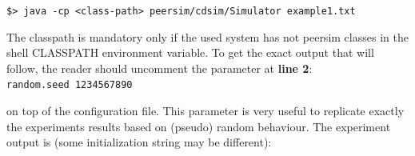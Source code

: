 \documentclass[a4paper,11pt]{article}
\begin{document}
\texttt{\footnotesize \$> java -cp <class-path> peersim/cdsim/Simulator
example1.txt}~\\
{\footnotesize \par}

The classpath is mandatory only if the used system has not peersim
classes in the shell CLASSPATH environment variable. To get the exact
output that will follow, the reader should uncomment the parameter
at \textbf{line 2}:\\


\texttt{\footnotesize random.seed 1234567890}~\\
{\footnotesize \par}

on top of the configuration file. This parameter is very useful to
replicate exactly the experiments results based on (pseudo) random
behaviour. The experiment output is (some initialization string may
be different):\\
\end{document}
